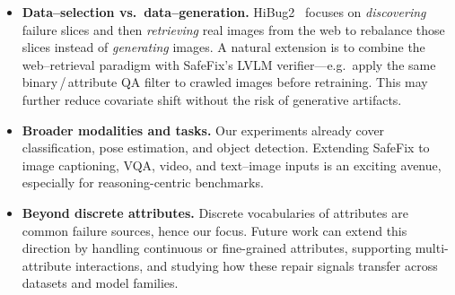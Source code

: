 \documentclass[10pt]{article} %
\newcommand{\model}{SafeFix\xspace}
\begin{document}
\begin{itemize}
  \item \textbf{Data–selection vs.\ data–generation.}  
        HiBug2~\citep{chen2025hibug2} focuses on \emph{discovering} failure slices and then
        \emph{retrieving} real images from the web to
        rebalance those slices instead of \emph{generating} images.  A natural extension is to combine the
        web–retrieval paradigm with SafeFix’s LVLM verifier—e.g.\ apply the
        same binary\,/\,attribute QA filter to crawled images before
        retraining. This may further reduce covariate shift without the
        risk of generative artifacts.




  \item \textbf{Broader modalities and tasks.}  
        Our experiments already cover classification, pose estimation, and
        object detection. Extending \model{} to image captioning, VQA, video,
        and text--image inputs is an exciting avenue, especially for
        reasoning-centric benchmarks.
        
    \item \textbf{Beyond discrete attributes.} Discrete vocabularies of attributes are common failure sources, hence our focus. Future work can extend this direction by handling continuous or fine-grained attributes, supporting multi-attribute interactions, and studying how these repair signals transfer across datasets and model families.
\end{itemize}
\end{document}
